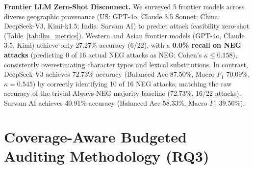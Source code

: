 \documentclass[11pt]{article}
\begin{document}
\begin{table}[!t]
\caption{Zero-shot attack tier prediction across 5 frontier LLMs ($N=22$ attacks: 16 NEG, 4 POS, 2 MID). Pred Distribution reports predicted counts [POS / MID / NEG].}
\label{tab:llm_metrics}
\centering
\begingroup
\renewcommand{\arraystretch}{0.84}
\endgroup
\end{table}

\textbf{Frontier LLM Zero-Shot Disconnect.} We surveyed 5 frontier models across diverse geographic provenance (US: GPT-4o, Claude 3.5 Sonnet; China: DeepSeek-V3, Kimi-k1.5; India: Sarvam AI) to predict attack feasibility zero-shot (Table~\ref{tab:llm_metrics}). Western and Asian frontier models (GPT-4o, Claude 3.5, Kimi) achieve only 27.27\% accuracy (6/22), with a \textbf{0.0\% recall on NEG attacks} (predicting 0 of 16 actual NEG attacks as NEG; Cohen's $\kappa \le 0.158$), consistently overestimating character typos and lexical substitutions. In contrast, DeepSeek-V3 achieves 72.73\% accuracy (Balanced Acc 87.50\%, Macro $F_1$ 70.09\%, $\kappa = 0.545$) by correctly identifying 10 of 16 NEG attacks, matching the raw accuracy of the trivial Always-NEG majority baseline (72.73\%, 16/22 attacks). Sarvam AI achieves 40.91\% accuracy (Balanced Acc 58.33\%, Macro $F_1$ 39.50\%).

\section{Coverage-Aware Budgeted Auditing Methodology (RQ3)}
\label{sec:auditing}
\end{document}
